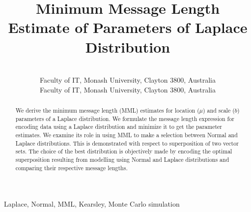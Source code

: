 \documentclass[wcp]{jmlr}
\title[MML Laplace]{Minimum Message Length Estimate of Parameters of Laplace Distribution}
\author{\Name{Parthan Kasarapu} \Email{parthan.kasarapu@monash.edu}\\
  \addr Faculty of IT, Monash University, Clayton 3800, Australia
  \AND
  \Name{Lloyd Allison} \Email{lloyd.allison@monash.edu}\\
  \addr Faculty of IT, Monash University, Clayton 3800, Australia
 }
\begin{document}
\maketitle

\begin{abstract}
We derive the minimum message length (MML) estimates for location ($\mu$) and 
scale ($b$) parameters of a Laplace distribution. We formulate the message 
length expression for encoding data using a Laplace distribution and minimize it
to get the parameter estimates. We examine its role in using MML to 
make a selection between Normal and Laplace distributions. This is demonstrated 
with respect to superposition of two vector sets. The choice of the best 
distribution is objectively made by encoding the optimal superposition 
resulting from modelling using Normal and Laplace
distributions and comparing their respective message lengths.
\end{abstract}


\begin{keywords}
Laplace, Normal, MML, Kearsley, Monte Carlo simulation
\end{keywords}
\end{document}
